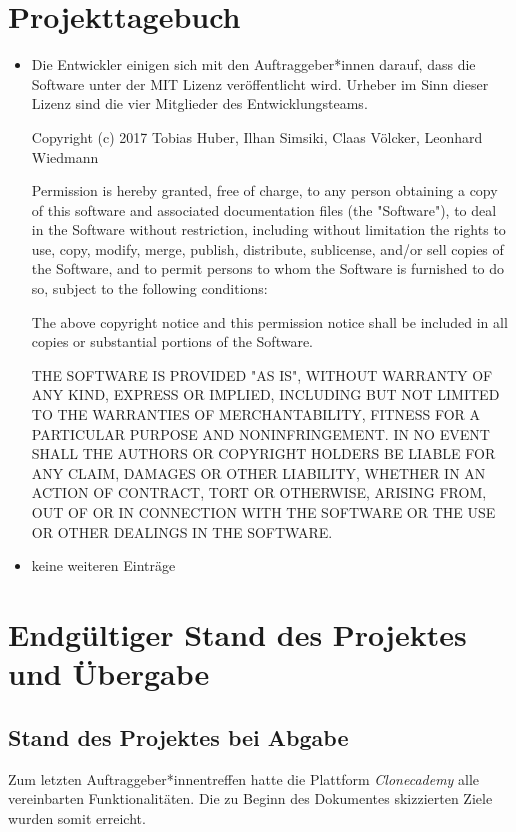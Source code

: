\documentclass[accentcolor=tud0b,12pt,paper=a4]{tudreport}
\begin{document}
\chapter{Projekttagebuch}
\begin{itemize}
		\item Die Entwickler einigen sich mit den Auftraggeber*innen darauf, dass die Software unter der MIT Lizenz veröffentlicht wird. Urheber im Sinn dieser Lizenz sind die vier Mitglieder des Entwicklungsteams.

			Copyright (c) 2017 Tobias Huber, Ilhan Simsiki, Claas Völcker, Leonhard Wiedmann

Permission is hereby granted, free of charge, to any person obtaining a copy of this software and associated documentation files (the "Software"), to deal in the Software without restriction, including without limitation the rights to use, copy, modify, merge, publish, distribute, sublicense, and/or sell copies of the Software, and to permit persons to whom the Software is furnished to do so, subject to the following conditions:

The above copyright notice and this permission notice shall be included in all copies or substantial portions of the Software.

THE SOFTWARE IS PROVIDED "AS IS", WITHOUT WARRANTY OF ANY KIND, EXPRESS OR IMPLIED, INCLUDING BUT NOT LIMITED TO THE WARRANTIES OF MERCHANTABILITY, FITNESS FOR A PARTICULAR PURPOSE AND NONINFRINGEMENT. IN NO EVENT SHALL THE AUTHORS OR COPYRIGHT HOLDERS BE LIABLE FOR ANY CLAIM, DAMAGES OR OTHER LIABILITY, WHETHER IN AN ACTION OF CONTRACT, TORT OR OTHERWISE, ARISING FROM, OUT OF OR IN CONNECTION WITH THE SOFTWARE OR THE USE OR OTHER DEALINGS IN THE SOFTWARE.
		\item keine weiteren Einträge
\end{itemize}


\chapter{Endgültiger Stand des Projektes und Übergabe}

	\section{Stand des Projektes bei Abgabe}
	Zum letzten Auftraggeber*innentreffen hatte die Plattform \emph{Clonecademy} alle vereinbarten Funktionalitäten. Die zu Beginn des Dokumentes skizzierten Ziele wurden somit erreicht. 
\end{document}
